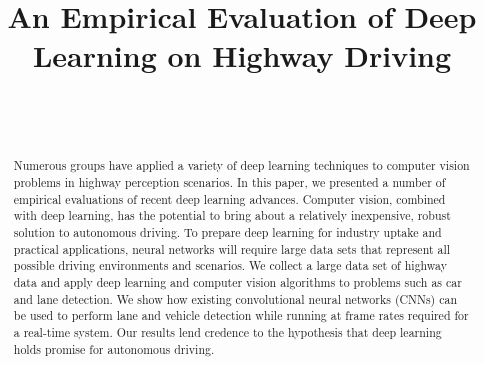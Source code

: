 \documentclass[journal]{IEEEtran}
\begin{document}
\title{An Empirical Evaluation of Deep Learning on Highway Driving}


\author{
 \\
~
~
~
 \\
}
















\maketitle


\begin{abstract}
\boldmath
Numerous groups have applied a variety of deep learning techniques to computer vision problems in highway perception scenarios. In this paper, we presented a number of empirical evaluations of recent deep learning advances. Computer vision, combined with deep learning, has the potential to bring about a relatively inexpensive, robust solution to autonomous driving. To prepare deep learning for industry uptake and practical applications, neural networks will require large data sets that represent all possible driving environments and scenarios. We collect a large data set of highway data and apply deep learning and computer vision algorithms to problems such as car and lane detection. We show how existing convolutional neural networks (CNNs) can be used to perform lane and vehicle detection while running at frame rates required for a real-time system. Our results lend credence to the hypothesis that deep learning holds promise for autonomous driving.

\end{abstract}
\end{document}
